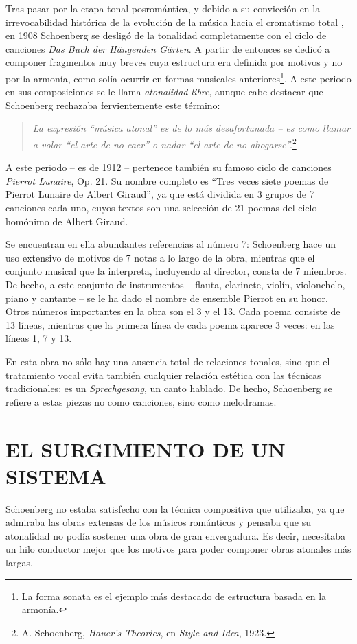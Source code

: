 		Tras pasar por la etapa tonal posromántica, y debido a su convicción en la irrevocabilidad histórica de la evolución de la música hacia el cromatismo total \cite{delgado}, en 1908 Schoenberg se desligó de la tonalidad completamente con el ciclo de canciones \emph{Das Buch der Hängenden Gärten}. A partir de entonces se dedicó a componer fragmentos muy breves cuya estructura era definida por motivos y no por la armonía, como solía ocurrir en formas musicales anteriores\footnote{La forma sonata es el ejemplo más destacado de estructura basada en la armonía.}. A este periodo en sus composiciones se le llama \emph{atonalidad libre}, aunque cabe destacar que Schoenberg rechazaba fervientemente este término:
		
		\begin{quote}
			\emph{La expresión “música atonal” es de lo más desafortunada -- es como llamar a volar “el arte de no caer” o nadar “el arte de no ahogarse”.}\footnote{A. Schoenberg, \emph{Hauer's Theories}, en \emph{Style and Idea}, 1923.}
		\end{quote}
				
		A este periodo -- es de 1912 -- pertenece también su famoso ciclo de canciones \emph{Pierrot Lunaire}, Op. 21. Su nombre completo es ``Tres veces siete poemas de Pierrot Lunaire de Albert Giraud'', ya que está dividida en 3 grupos de 7 canciones cada uno, cuyos textos son una selección de 21 poemas del ciclo homónimo de Albert Giraud. 
		
		Se encuentran en ella abundantes referencias al número 7: Schoenberg hace un uso extensivo de motivos de 7 notas a lo largo de la obra, mientras que el conjunto musical que la interpreta, incluyendo al director, consta de 7 miembros. De hecho, a este conjunto de instrumentos -- flauta, clarinete, violín, violonchelo, piano y cantante -- se le ha dado el nombre de ensemble Pierrot en su honor. Otros números importantes en la obra son el 3 y el 13. Cada poema consiste de 13 líneas, mientras que la primera línea de cada poema aparece 3 veces: en las líneas 1, 7 y 13.
		
		En esta obra no sólo hay una ausencia total de relaciones tonales, sino que el tratamiento vocal evita también cualquier relación estética con las técnicas tradicionales: es un \emph{Sprechgesang}, un canto hablado. De hecho, Schoenberg se refiere a estas piezas no como canciones, sino como melodramas. \cite{diaz}
		
	\section{EL SURGIMIENTO DE UN SISTEMA}
		Schoenberg no estaba satisfecho con la técnica compositiva que utilizaba, ya que admiraba las obras extensas de los músicos románticos y pensaba que su atonalidad no podía sostener una obra de gran envergadura. Es decir, necesitaba un hilo conductor mejor que los motivos para poder componer obras atonales más largas.
		
